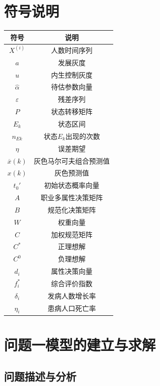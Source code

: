 \documentclass{whutmod}
\begin{document}
	\section{符号说明}
	\begin{table}[H]
	\label{biao} \centering
	\begin{tabular}{cc}
		\toprule[1.5pt]
		\multicolumn{1}{m{5cm}}{\centering 符号} & \multicolumn{1}{m{5cm}}{\centering 说明} \\
		\midrule[1pt]		
		$X^{(i)}$  & 人数时间序列  \\ 
		$a$  &  发展灰度 \\ 
		$u$  &  内生控制灰度\\
		$\widehat{\alpha}$  &  待估参数向量 \\ 
		$\varepsilon$ & 残差序列\\
		$P$	 &  状态转移矩阵  \\ 
		$E_{k}$ &  状态区间 \\ 
		$n_{Ek}$	 &  状态$E_{k}$出现的次数 \\ 
		$\eta $  &   误差期望\\ 
		$\overline{x}(k)$  &  灰色马尔可夫组合预测值\\	
		$\widehat{x}(k)$ & 灰色预测值\\
		$t_{0}'$ &  初始状态概率向量\\ 
		$A$ & 职业多属性决策矩阵\\
		$B$ & 规范化决策矩阵\\
		$W$ & 权重向量\\
		$C$  & 加权规范矩阵\\
		$C^{*}$ & 正理想解\\
		$C^{0}$ & 负理想解\\
		$d_{i}$ & 属性决策向量\\
		$ f_{i}^{*}$ &  综合评价指数\\
		$ \delta_{i}$ &发病人数增长率 \\
		$ \eta_{i}$    &患病人口死亡率 \\
		\bottomrule[1.5pt]
	\end{tabular}
\end{table}

	\section{问题一模型的建立与求解}
    \subsection{问题描述与分析}
\end{document}
